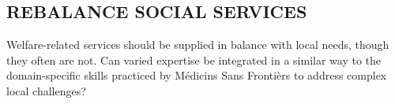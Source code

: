 \subsection*{\normalsize{} REBALANCE SOCIAL SERVICES{\hfill \motor}}\label{pat:rebalance-social-services}

Welfare-related services should be supplied in balance with local needs, though they often are not. Can varied expertise be integrated in a similar way to the domain-specific skills practiced by Médicins Sans Frontièrs to address complex local challenges?

